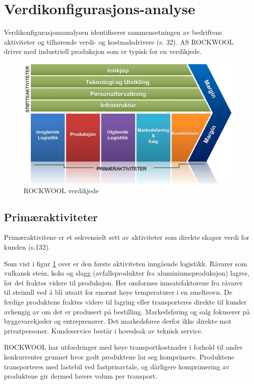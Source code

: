 \section{Verdikonfigurasjons-analyse}
Verdikonfigurasjonsanalysen identifiserer sammensetningen av bedriftens aktiviteter og tilhørende verdi- og kostnadsdrivere (s. 32). AS ROCKWOOL driver med industriell produksjon som er typisk for en verdikjede.

\begin{figure}[H]
\centering
\includegraphics [scale=0.5]{bilder/verdikjede.png}
\caption{ROCKWOOL verdikjede}
\label{fig:verdikjede}
\end{figure}

\subsection{Primæraktiviteter}
Primæraktivitene er et sekvensielt sett av aktiviteter som direkte skaper verdi for kunden (s.132). 
 
\indent \newline
Som vist i figur \ref{fig:verdikjede} over er den første aktiviteten inngående logistikk. Råvarer som vulkansk stein, koks og slagg (avfallsprodukter fra aluminiumsproduksjon) lagres, før det fraktes videre til produksjon. Her omformes innsatsfaktorene fra råvarer til steinull ved å bli utsatt for enormt høye temperaturer i en smelteovn. De ferdige produktene fraktes videre til lagring eller transporteres direkte til kunder avhengig av om det er produsert på bestilling. Markedsføring og salg fokuserer på byggevarekjeder og entreprenører. Det markedsføres derfor ikke direkte mot privatpersoner. Kundeservice består i hovedsak av teknisk service.

\indent \newline
ROCKWOOL har utfordringer med høye transportkostnader i forhold til andre konkurrenter grunnet hvor godt produktene lar seg komprimere. Produktene transporteres med lastebil ved fastprisavtale, og dårligere komprimering av produktene gir dermed lavere volum per transport. 

